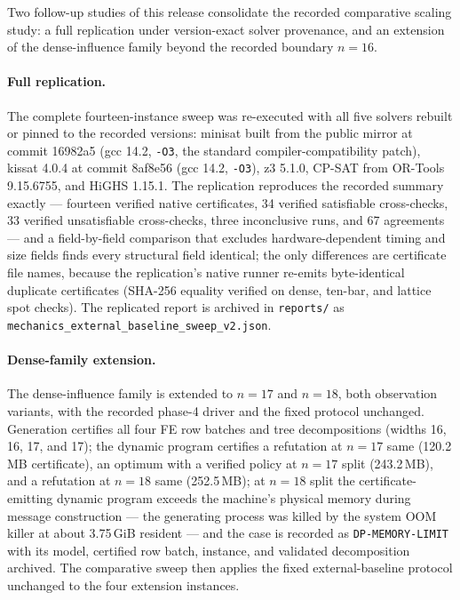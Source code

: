 \documentclass[11pt]{article}
\theoremstyle{plain}
\theoremstyle{definition}
\theoremstyle{remark}
\begin{document}
Two follow-up studies of this release consolidate the recorded comparative
scaling study: a full replication under version-exact solver provenance,
and an extension of the dense-influence family beyond the recorded boundary
\(n{=}16\).

\paragraph{Full replication.}
The complete fourteen-instance sweep was re-executed with all five solvers
rebuilt or pinned to the recorded versions: minisat built from the public
mirror at commit 16982a5 (gcc 14.2, \texttt{-O3}, the standard
compiler-compatibility patch), kissat 4.0.4 at commit 8af8e56 (gcc 14.2,
\texttt{-O3}), z3 5.1.0, CP-SAT from OR-Tools 9.15.6755, and HiGHS 1.15.1.
The replication reproduces the recorded summary exactly --- fourteen
verified native certificates, 34 verified satisfiable cross-checks, 33
verified unsatisfiable cross-checks, three inconclusive runs, and 67
agreements --- and a field-by-field comparison that excludes
hardware-dependent timing and size fields finds every structural field
identical; the only differences are certificate file names, because the
replication's native runner re-emits byte-identical duplicate certificates
(SHA-256 equality verified on dense, ten-bar, and lattice spot checks).
The replicated report is archived in \texttt{reports/} as
\texttt{mechanics\_external\_baseline\_sweep\_v2.json}.

\paragraph{Dense-family extension.}
The dense-influence family is extended to \(n{=}17\) and \(n{=}18\), both
observation variants, with the recorded phase-4 driver and the fixed
protocol unchanged.  Generation certifies all four FE row batches and
tree decompositions (widths 16, 16, 17, and 17); the dynamic program
certifies a refutation at \(n{=}17\) same (120.2\,MB certificate), an
optimum with a verified policy at \(n{=}17\) split (243.2\,MB), and a
refutation at \(n{=}18\) same (252.5\,MB); at \(n{=}18\) split the
certificate-emitting dynamic program exceeds the machine's physical memory
during message construction --- the generating process was killed by the
system OOM killer at about 3.75\,GiB resident --- and the case is recorded
as \texttt{DP-MEMORY-LIMIT} with its model, certified row batch, instance,
and validated decomposition archived.  The comparative sweep then applies
the fixed external-baseline protocol unchanged to the four extension
instances.
\end{document}
